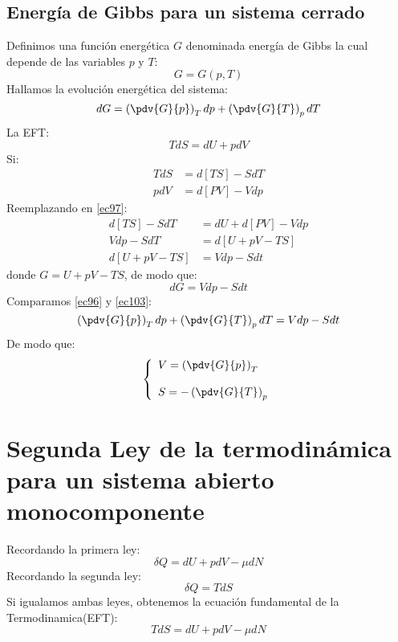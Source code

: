 \documentclass[../main]{subfiles}
\begin{document}
\section{Energía de Gibbs para un sistema cerrado}
Definimos una función energética $G$ denominada energía de Gibbs la cual depende de las variables $p$ y $T$:
\begin{equation}
    G=G(p,T)
\end{equation}
Hallamos la evolución energética del sistema:
\begin{equation}
    dG=\left( \pdv{G}{p}\right)_T dp+\left( \pdv{G}{T}\right)_p dT
    \label{ec96}
\end{equation}
La EFT:
\begin{equation}
    TdS=dU+pdV
    \label{ec97}
\end{equation}
Si:
\begin{align}
    TdS & =d[TS]-SdT \\
    pdV & =d[PV]-Vdp
\end{align}
Reemplazando en \eqref{ec97}:
\begin{align}
    d[TS]-SdT  & =dU+d[PV]-Vdp \\
    Vdp-SdT    & =d[U+pV-TS]   \\
    d[U+pV-TS] & = Vdp-Sdt
\end{align}
donde $G=U+pV-TS$, de modo que:
\begin{equation}
    dG=Vdp-Sdt
    \label{ec103}
\end{equation}
Comparamos \eqref{ec96} y \eqref{ec103}:
\begin{equation}
    \left( \pdv{G}{p}\right)_T dp+\left( \pdv{G}{T}\right)_p dT=Vdp-Sdt
\end{equation}
De modo que:
\begin{equation}
    \left\{
    \begin{array}{l}
        V=\displaystyle \left( \pdv{G}{p} \right)_{T} \\ \\
        S=-\displaystyle \left(\pdv{G}{T}\right)_{p}
    \end{array}
    \right.
\end{equation}

\chapter{Segunda Ley de la termodinámica para un sistema abierto monocomponente}
Recordando la primera ley:
\begin{equation}
    \delta Q = dU+pdV-\mu dN
\end{equation}
Recordando la segunda ley:
\begin{equation}
    \delta Q = TdS
\end{equation}
Si igualamos ambas leyes, obtenemos la ecuación fundamental de la Termodinamica(EFT):
\begin{equation}
    TdS=dU+pdV-\mu dN
\end{equation}
\end{document}
